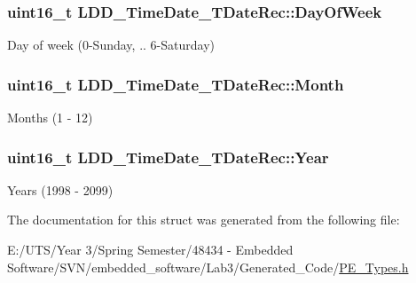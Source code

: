 \subsubsection[{Day\+Of\+Week}]{\setlength{\rightskip}{0pt plus 5cm}uint16\+\_\+t L\+D\+D\+\_\+\+Time\+Date\+\_\+\+T\+Date\+Rec\+::\+Day\+Of\+Week}\label{struct_l_d_d___time_date___t_date_rec_a11ed8bc2e3fbd80252a7d4802d316f1c}
Day of week (0-\/\+Sunday, .. 6-\/\+Saturday) \hypertarget{struct_l_d_d___time_date___t_date_rec_a28aaeffe98b07d60db379d12269fa822}{}
\subsubsection[{Month}]{\setlength{\rightskip}{0pt plus 5cm}uint16\+\_\+t L\+D\+D\+\_\+\+Time\+Date\+\_\+\+T\+Date\+Rec\+::\+Month}\label{struct_l_d_d___time_date___t_date_rec_a28aaeffe98b07d60db379d12269fa822}
Months (1 -\/ 12) \hypertarget{struct_l_d_d___time_date___t_date_rec_a58eee644efb4f46adc3437063c7bc194}{}
\subsubsection[{Year}]{\setlength{\rightskip}{0pt plus 5cm}uint16\+\_\+t L\+D\+D\+\_\+\+Time\+Date\+\_\+\+T\+Date\+Rec\+::\+Year}\label{struct_l_d_d___time_date___t_date_rec_a58eee644efb4f46adc3437063c7bc194}
Years (1998 -\/ 2099) 

The documentation for this struct was generated from the following file\+:\begin{DoxyCompactItemize}
\item 
E\+:/\+U\+T\+S/\+Year 3/\+Spring Semester/48434 -\/ Embedded Software/\+S\+V\+N/embedded\+\_\+software/\+Lab3/\+Generated\+\_\+\+Code/\hyperlink{_p_e___types_8h}{P\+E\+\_\+\+Types.\+h}\end{DoxyCompactItemize}
